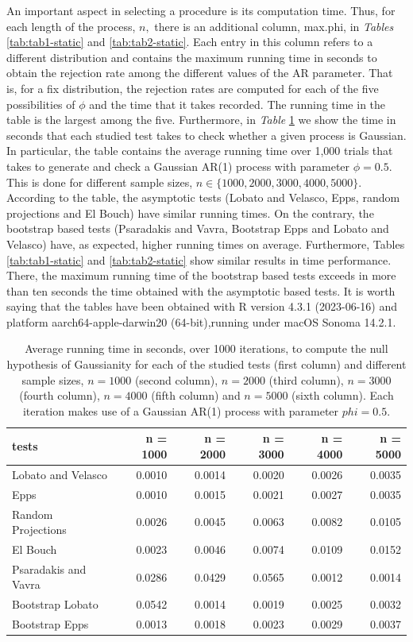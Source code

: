 An important aspect in selecting a procedure is its computation time. Thus, for each length of the process, \(n,\) there is an additional column, max.phi, in \emph{Tables} \ref{tab:tab1-static} and \ref{tab:tab2-static}. Each entry in this column refers to a different distribution and contains the maximum running time in seconds to obtain the rejection rate among the different values of the AR parameter. That is, for a fix distribution, the rejection rates are computed for each of the five possibilities of \(\phi\) and the time that it takes recorded. The running time in the table is the largest among the five. Furthermore, in \textit{Table} \ref{tab:tab3-static} we show the time in seconds that each studied test takes to check whether a given process is Gaussian. In particular, the table contains the average running time over 1,000 trials that takes to generate and check a Gaussian AR(1) process with parameter \(\phi = 0.5\). This is done for different sample sizes, \(n \in \{1000, 2000, 3000, 4000, 5000\}.\) According to the table, the asymptotic tests (Lobato and Velasco, Epps, random projections and El Bouch) have similar running times. On the contrary, the bootstrap based tests (Psaradakis and Vavra, Bootstrap Epps and Lobato and Velasco) have, as expected, higher running times on average. Furthermore, Tables \ref{tab:tab1-static} and \ref{tab:tab2-static} show similar results in time performance. There, the maximum running time of the bootstrap based tests exceeds in more than ten seconds the time obtained with the asymptotic based tests. It is worth saying that the tables have been obtained with R version 4.3.1 (2023-06-16) and platform aarch64-apple-darwin20 (64-bit),running under macOS Sonoma 14.2.1.

\begin{table}

\caption{\label{tab:tab3-static}Average running time in seconds, over 1000 iterations,  to compute the null hypothesis of Gaussianity for each of the studied tests (first column) and different sample sizes, $n=1000$ (second column), $n=2000$ (third column), $n=3000$ (fourth column), $n=4000$ (fifth column) and $n=5000$ (sixth column). Each iteration makes use of a Gaussian AR(1) process with parameter $phi = 0.5.$}
\centering
\begin{tabular}[t]{lrrrrr}
\toprule
tests & n = 1000 & n = 2000 & n = 3000 & n = 4000 & n = 5000\\
\midrule
Lobato and Velasco & 0.0010 & 0.0014 & 0.0020 & 0.0026 & 0.0035\\
Epps & 0.0010 & 0.0015 & 0.0021 & 0.0027 & 0.0035\\
Random Projections & 0.0026 & 0.0045 & 0.0063 & 0.0082 & 0.0105\\
El Bouch & 0.0023 & 0.0046 & 0.0074 & 0.0109 & 0.0152\\
Psaradakis and Vavra & 0.0286 & 0.0429 & 0.0565 & 0.0012 & 0.0014\\
\addlinespace
Bootstrap Lobato & 0.0542 & 0.0014 & 0.0019 & 0.0025 & 0.0032\\
Bootstrap Epps & 0.0013 & 0.0018 & 0.0023 & 0.0029 & 0.0037\\
\bottomrule
\end{tabular}
\end{table}

